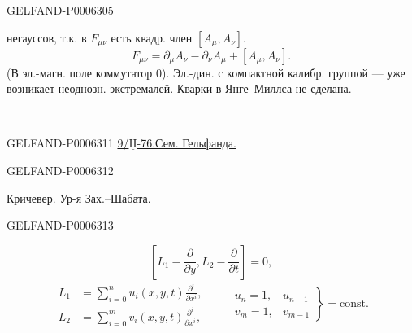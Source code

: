 \begin{GelfandAdjacentEvidence}{GELFAND-P000630}{5}

негауссов, т.к. в \(F_{\mu\nu}\) есть квадр. член \([A_\mu,A_\nu]\).
\[
F_{\mu\nu}=\partial_\mu A_\nu-\partial_\nu A_\mu+[A_\mu,A_\nu].
\]
(В эл.-магн. поле коммутатор \(0\)).
Эл.-дин. с компактной калибр. группой --- уже возникает неоднозн. экстремалей.
\underline{Кварки в Янге--Миллса не сделана.}
\end{GelfandAdjacentEvidence}

\begin{center}\textemdash\,\textperiodcentered\,\textemdash\end{center}


\begin{GelfandAdjacentEvidence}{GELFAND-P000631}{1}
\underline{9/\(\overline{\underline{\mathrm{II}}}\)-76.}\qquad\underline{Сем. Гельфанда.}
\end{GelfandAdjacentEvidence}
\begin{GelfandAdjacentEvidence}{GELFAND-P000631}{2}

\underline{Кричевер.}
\underline{Ур-я Зах.--Шабата.}
\end{GelfandAdjacentEvidence}
\begin{GelfandAdjacentEvidence}{GELFAND-P000631}{3}

\begin{equation*}
\left[L_1-\frac{\partial}{\partial y},L_2-\frac{\partial}{\partial t}\right]=0,\tag{1}
\end{equation*}
\[
\begin{aligned}
L_1&=\sum_{i=0}^n u_i(x,y,t)\frac{\partial^i}{\partial x^i},\\
L_2&=\sum_{i=0}^m v_i(x,y,t)\frac{\partial^i}{\partial x^i},
\end{aligned}
\qquad
\left.\begin{array}{ll}u_n=1,&u_{n-1}\\v_m=1,&v_{m-1}\end{array}\right\}
=\mathrm{const}.
\]
\end{GelfandAdjacentEvidence}
